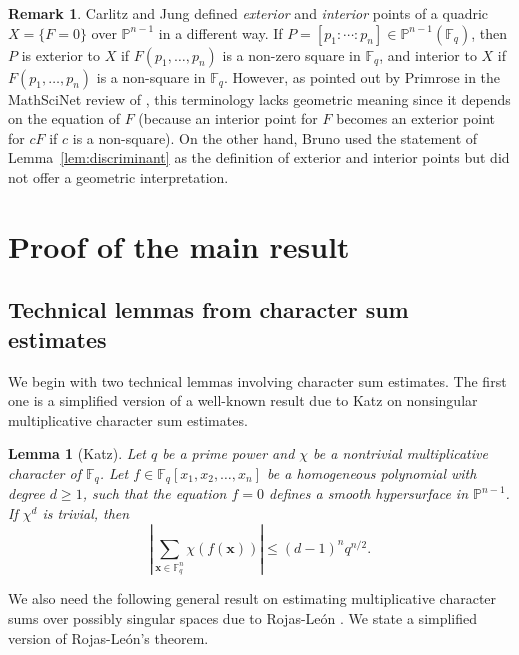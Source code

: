 \documentclass[12pt,reqno]{amsart}
\newtheorem{lem}[thm]{Lemma}
\theoremstyle{definition}
\newtheorem{rem}[thm]{Remark}
\newcommand{\F}{\mathbb{F}}
\begin{document}
\begin{rem}\label{rem:past-work}    
Carlitz \cite{C66} and Jung \cite{J72} defined \emph{exterior} and \emph{interior} points of a quadric $X=\{F=0\}$ over $\mathbb{P}^{n-1}$ in a different way. If $P=[p_1: \cdots :p_n] \in \mathbb{P}^{n-1}(\F_q)$, then $P$ is exterior to $X$ if $F(p_1, \ldots, p_n)$ is a non-zero square in $\F_q$, and interior to $X$ if $F(p_1, \ldots, p_n)$ is a non-square in $\F_q$.  However, as pointed out by Primrose \cite{P72} in the MathSciNet review of \cite{J72}, this terminology lacks geometric meaning since it depends on the equation of $F$ (because an interior point for $F$ becomes an exterior point for $cF$ if $c$ is a non-square). On the other hand, Bruno \cite[Section 9]{B68} used the statement of Lemma~\ref{lem:discriminant} as the definition of exterior and interior points but did not offer a geometric interpretation. 
\end{rem}

\section{Proof of the main result}

\subsection{Technical lemmas from character sum estimates}\label{sec:character-sums}

We begin with two technical lemmas involving character sum estimates. The first one is a simplified version of a well-known result due to Katz \cite[Theorem 2.2]{K02} on nonsingular multiplicative character sum estimates.

\begin{lem}[Katz]\label{lem:Katz}
Let $q$ be a prime power and $\chi$ be a nontrivial multiplicative character of $\F_q$. Let $f\in \F_q[x_1,x_2,\ldots, x_n]$ be a homogeneous polynomial with degree $d\geq 1$, such that the equation $f=0$ defines a smooth hypersurface in $\mathbb{P}^{n-1}$. If $\chi^d$ is trivial, then 
$$
\left|\sum_{\mathbf{x}\in \F_q^n} \chi(f(\mathbf{x}))\right| \leq (d-1)^n q^{n/2}.
$$    
\end{lem}

We also need the following general result on estimating multiplicative character sums over possibly singular spaces due to Rojas-Le\'{o}n \cite[Theorem 1.1(a)]{RL05}. We state a simplified version of Rojas-Le\'{o}n's theorem. 
\end{document}
